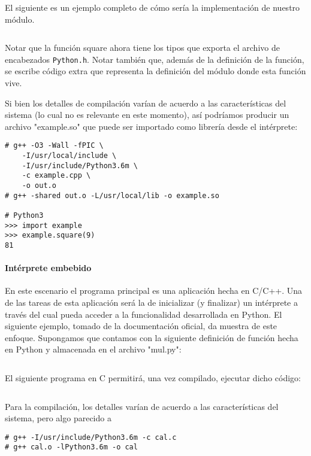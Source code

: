 \documentclass[]{article}
\begin{document}
El siguiente es un ejemplo completo de cómo sería la implementación de nuestro módulo. 

\inputminted{c}{codelistings/module.c}

Notar que la función square ahora tiene los tipos que exporta el archivo de
encabezados \verb!Python.h!. Notar también que, además de la definición de la
función, se escribe código extra que representa la definición del módulo donde
esta función vive.

Si bien los detalles de compilación varían de acuerdo a las características del
sistema (lo cual no es relevante en este momento), así podríamos producir un
archivo "example.so" que puede ser importado como librería desde el intérprete:

\begin{verbatim}
# g++ -O3 -Wall -fPIC \
    -I/usr/local/include \
    -I/usr/include/Python3.6m \
    -c example.cpp \
    -o out.o
# g++ -shared out.o -L/usr/local/lib -o example.so

# Python3
>>> import example
>>> example.square(9)
81
\end{verbatim}

\paragraph{Intérprete embebido}

En este escenario el programa principal es una aplicación hecha en C/C++. Una
de las tareas de esta aplicación será la de inicializar (y finalizar) un
intérprete a través del cual pueda acceder a la funcionalidad desarrollada en
Python. El siguiente ejemplo, tomado de la documentación oficial, da muestra de
este enfoque. Supongamos que contamos con la siguiente definición de función
hecha en Python y almacenada en el archivo "mul.py":

\inputminted{Python}{codelistings/multiply.py}

El siguiente programa en C permitirá, una vez compilado, ejecutar dicho código:

\inputminted{c}{codelistings/use_multiply.c}

Para la compilación, los detalles varían de acuerdo a las características del
sistema, pero algo parecido a

\begin{verbatim}
# g++ -I/usr/include/Python3.6m -c cal.c
# g++ cal.o -lPython3.6m -o cal
\end{verbatim}
\end{document}
